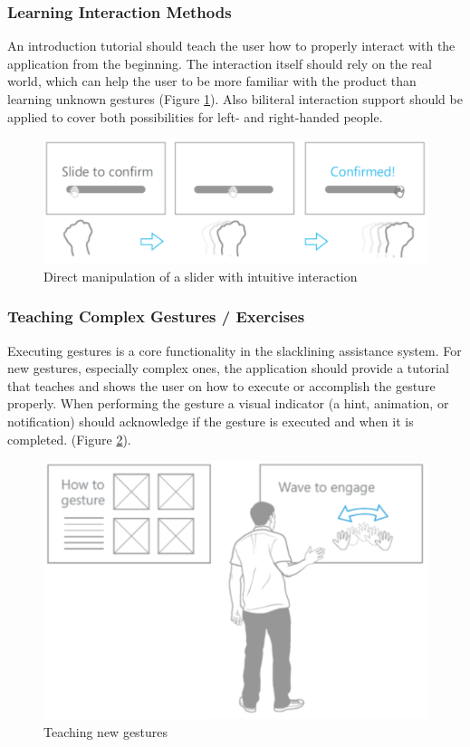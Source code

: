 \subsubsection{Learning Interaction Methods}
An introduction tutorial should teach the user how to properly interact with the application from the beginning. The interaction itself should rely on the real world, which can help the user to be more familiar with the product than learning unknown gestures (Figure \ref{fig:hciGuidelinesDynamicGesture}). Also biliteral interaction support should be applied to cover both possibilities for left- and right-handed people.
\begin{figure}[htb]
	\centering
	\begin{minipage}[t]{1\linewidth}
		\centering
		\includegraphics[width=0.75\linewidth]{Pictures/hciGuidelinesDynamicGesture}
		\caption{Direct manipulation of a slider with intuitive interaction~\cite{MicrosoftHIG2014-mh}}
		\label{fig:hciGuidelinesDynamicGesture}
	\end{minipage}
\end{figure}

\subsubsection{Teaching Complex Gestures / Exercises}
Executing gestures is a core functionality in the slacklining assistance system. For new gestures, especially complex ones, the application should provide a tutorial that teaches and shows the user on how to execute or accomplish the gesture properly. When performing the gesture a visual indicator (a hint, animation, or notification) should acknowledge if the gesture is executed and when it is completed. (Figure \ref{fig:hciGuidelinesTeachingMethods}).
\begin{figure}[htb]
	\centering
	\begin{minipage}[t]{1\linewidth}
		\centering
		\includegraphics[width=0.65\linewidth]{Pictures/hciGuidelinesTeachingMethods}
		\caption{Teaching new gestures~\cite{MicrosoftHIG2014-mh}}
		\label{fig:hciGuidelinesTeachingMethods}
	\end{minipage}
\end{figure}

